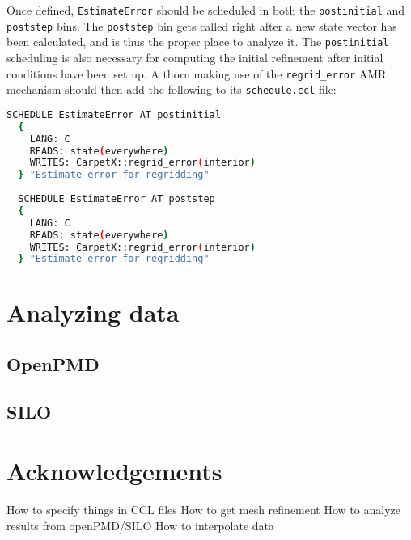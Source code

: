 Once defined, \texttt{EstimateError} should be scheduled in both the \texttt{postinitial} and \texttt{poststep} bins. The \texttt{poststep} bin gets called right after a new state vector has been calculated, and is thus the proper place to analyze it. The \texttt{postinitial} scheduling is also necessary for computing the initial refinement after initial conditions have been set up. A thorn making use of the \texttt{regrid\_error} AMR mechanism should then add the following to its \texttt{schedule.ccl} file:

\begin{lstlisting}[language=bash]
  SCHEDULE EstimateError AT postinitial
  {
    LANG: C
    READS: state(everywhere)
    WRITES: CarpetX::regrid_error(interior)
  } "Estimate error for regridding"
  
  SCHEDULE EstimateError AT poststep
  {
    LANG: C
    READS: state(everywhere)
    WRITES: CarpetX::regrid_error(interior)
  } "Estimate error for regridding"
\end{lstlisting}

\section{Analyzing data}
\label{sec:data}

\subsection{OpenPMD}
\label{sec:openpmd}

\subsection{SILO}
\label{sec:silo}

\section{Acknowledgements}

\begin{thebibliography}{9}
\end{thebibliography}




How to specify things in CCL files
How to get mesh refinement
How to analyze results from openPMD/SILO
How to interpolate data